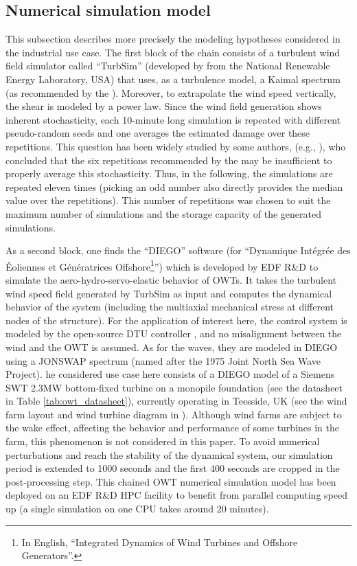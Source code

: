 \subsection{Numerical simulation model}
This subsection describes more precisely the modeling hypotheses considered in the industrial use case. 
The first block of the chain consists of a turbulent wind field simulator called ``TurbSim'' (developed by \cite{turbsim_2009} from the National Renewable Energy Laboratory, USA) that uses, as a turbulence model, a Kaimal spectrum \citep{kaimal_1972} (as recommended by the \citet{iec_2019}). 
Moreover, to extrapolate the wind speed vertically, the shear is modeled by a power law. 
Since the wind field generation shows inherent stochasticity, each 10-minute long simulation is repeated with different pseudo-random seeds and one averages the estimated damage over these repetitions. 
This question has been widely studied by some authors, (e.g., \cite{slot_sorensen_2020}), who concluded that the six repetitions recommended by the \citet{iec_2019} may be insufficient to properly average this stochasticity. 
Thus, in the following, the simulations are repeated eleven times (picking an odd number also directly provides the median value over the repetitions). 
This number of repetitions was chosen to suit the maximum number of simulations and the storage capacity of the generated simulations.

As a second block, one finds the ``DIEGO'' software (for ``Dynamique Intégrée des Éoliennes et Génératrices Offshore\footnote{In English, ``Integrated Dynamics of Wind Turbines and Offshore Generators''.}'') which is developed by EDF R\&D \citep{kim_natarajan_2022} to simulate the aero-hydro-servo-elastic behavior of OWTs. 
It takes the turbulent wind speed field generated by TurbSim as input and computes the dynamical behavior of the system (including the multiaxial mechanical stress at different nodes of the structure). 
For the application of interest here, the control system is modeled by the open-source DTU controller \citep{dtu_controler_2013}, and no misalignment between the wind and the OWT is assumed. 
As for the waves, they are modeled in DIEGO using a JONSWAP spectrum (named after the 1975 Joint North Sea Wave Project). 
he considered use case here consists of a DIEGO model of a Siemens SWT 2.3MW bottom-fixed turbine on a monopile foundation (see the datasheet in Table \ref{tab:owt_datasheet}), currently operating in Teesside, UK (see the wind farm layout and wind turbine diagram in ). 
Although wind farms are subject to the wake effect, affecting the behavior and performance of some turbines in the farm, this phenomenon is not considered in this paper. 
To avoid numerical perturbations and reach the stability of the dynamical system, our simulation period is extended to 1000 seconds and the first 400 seconds are cropped in the post-processing step. 
This chained OWT numerical simulation model has been deployed on an EDF R\&D HPC facility to benefit from parallel computing speed up (a single simulation on one CPU takes around 20 minutes).

